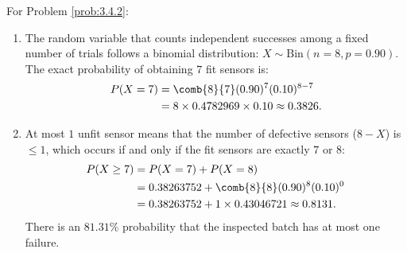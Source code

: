\begin{solucion}
	\label{sol:3.4.2}
	For Problem \ref{prob:3.4.2}:
	\begin{enumerate}
		\item The random variable that counts independent successes among a fixed number of trials follows a binomial distribution: $X \sim \text{Bin}(n=8, p=0.90)$. The exact probability of obtaining $7$ fit sensors is:
		\begin{align*}
			P(X = 7) &= \comb{8}{7} (0.90)^7 (0.10)^{8-7} \\
			&= 8 \times 0.4782969 \times 0.10 \approx 0.3826.
		\end{align*}
		\item At most $1$ unfit sensor means that the number of defective sensors ($8-X$) is $\le 1$, which occurs if and only if the fit sensors are exactly $7$ or $8$:
		\begin{align*}
			P(X \ge 7) &= P(X = 7) + P(X = 8) \\
			&= 0.38263752 + \comb{8}{8} (0.90)^8 (0.10)^0 \\
			&= 0.38263752 + 1 \times 0.43046721 \approx 0.8131.
		\end{align*}
		There is an $81.31\%$ probability that the inspected batch has at most one failure.
	\end{enumerate}
\end{solucion}

